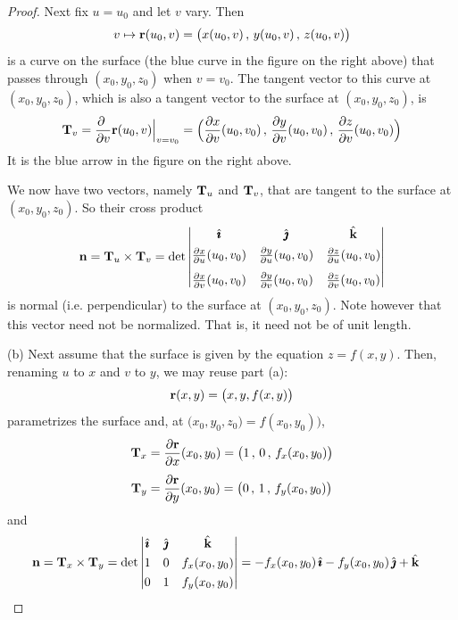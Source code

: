 \begin{proof}
Next fix $u=u_0$ and let $v$ vary. Then
\begin{equation*}
v\mapsto \mathbf{r}(u_0,v) = \big(x(u_0,v)\,,\,y(u_0,v)\,,\,z(u_0,v)\big)
\end{equation*}
is a curve on the surface (the blue curve in the figure on the right above) 
that passes through $(x_0,y_0,z_0)$ when $v=v_0$.
The tangent vector to this curve at  $(x_0,y_0,z_0)$,
which is also a tangent vector to the surface at $(x_0,y_0,z_0)$,
is
\begin{equation*}
\mathbf{T}_v = \frac{\partial\ }{\partial v}\mathbf{r}(u_0,v)\Big|_{v=v_0}
=\Big(\frac{\partial x}{\partial v}(u_0,v_0)\,,\,
      \frac{\partial y}{\partial v}(u_0,v_0)\,,\,
      \frac{\partial z}{\partial v}(u_0,v_0)\Big)
\end{equation*}
It is the blue arrow in the figure on the right above.

We now have two vectors, namely $\mathbf{T}_u$ and $\mathbf{T}_v$, that are tangent
to the surface at $(x_0,y_0,z_0)$. So their cross product
\begin{align*}
\mathbf{n} = \mathbf{T}_u\times\mathbf{T}_v
=\det\left|\begin{matrix}
            \hat{\pmb{\imath}} &  \hat{\pmb{\jmath}} & \hat{\mathbf{k}} \\[0.05in]
            \frac{\partial x}{\partial u}(u_0,v_0) &
                     \frac{\partial y}{\partial u}(u_0,v_0) &
                     \frac{\partial z}{\partial u}(u_0,v_0) \\[0.1in]
           \frac{\partial x}{\partial v}(u_0,v_0) &
                     \frac{\partial y}{\partial v}(u_0,v_0) &
                     \frac{\partial z}{\partial v}(u_0,v_0)
           \end{matrix}\right|
\end{align*}
is normal (i.e. perpendicular) to the surface at $(x_0,y_0,z_0)$.
Note however that this vector need not be normalized. That is, it need not 
be of unit length.

\bigskip
\noindent (b)
Next assume that the surface is given by the equation
$z=f(x,y)$. Then, renaming $u$ to $x$ and $v$ to $y$, we may reuse part (a):
\begin{equation*}
\mathbf{r}(x,y) = \big(x,y, f(x,y)\big)
\end{equation*}
parametrizes the surface and, at $\big(x_0,y_0,z_0\big)=f(x_0,y_0)\big)$,
\begin{align*}
\mathbf{T}_x &= \frac{\partial\mathbf{r} }{\partial x}(x_0,y_0)
=\big(1\,,\,
      0\,,\,
      f_x(x_0,y_0)\big)
\\[0.05in]
\mathbf{T}_y &= \frac{\partial\mathbf{r} }{\partial y}(x_0,y_0)
=\big(0\,,\,
      1\,,\,
      f_y(x_0,y_0)\big)
\end{align*}
and
\begin{align*}
\mathbf{n} &= \mathbf{T}_x\times\mathbf{T}_y
=\det\left|\begin{matrix}
            \hat{\pmb{\imath}} &  \hat{\pmb{\jmath}} & \hat{\mathbf{k}} \\[0.05in]
            1 & 0 & f_x(x_0,y_0) \\[0.05in]
            0 & 1 & f_y(x_0,y_0)
           \end{matrix}\right|
=-f_x(x_0,y_0)\,\hat{\pmb{\imath}} - f_y(x_0,y_0)\,\hat{\pmb{\jmath}} + \hat{\mathbf{k}}
\end{align*}


\end{proof}
